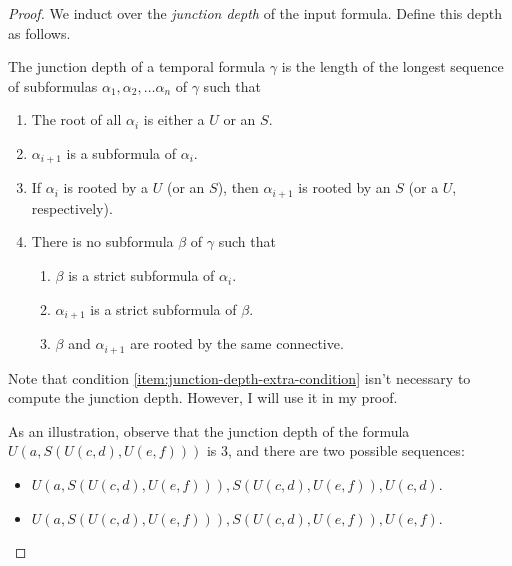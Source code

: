 \documentclass[a4paper,UKenglish,cleveref, autoref, thm-restate, numberwithinsect]{lipics-v2021}
\begin{document}
\begin{proof}
    We induct over the \textit{junction depth} of the input formula. Define this depth as follows.
    \begin{definition}
        The junction depth of a temporal formula $\gamma$ is the length of the longest sequence of subformulas $\alpha_1, \alpha_2, \ldots \alpha_n$ of $\gamma$ such that
        \begin{enumerate}
            \item The root of all $\alpha_i$ is either a $U$ or an $S$.
            \item $\alpha_{i+1}$ is a subformula of $\alpha_i$.
            \item If $\alpha_i$ is rooted by a $U$ (or an $S$), then $\alpha_{i+1}$ is rooted by an $S$ (or a $U$, respectively).
            \item There is no subformula $\beta$ of $\gamma$ such that \label{item:junction-depth-extra-condition}
                \begin{enumerate}
                    \item $\beta$ is a strict subformula of $\alpha_i$.
                    \item $\alpha_{i+1}$ is a strict subformula of $\beta$.
                    \item $\beta$ and $\alpha_{i+1}$ are rooted by the same connective.
                \end{enumerate}
        \end{enumerate}
    \end{definition}
    Note that condition \ref{item:junction-depth-extra-condition} isn't necessary to compute the junction depth. However, I will use it in my proof.

    As an illustration, observe that the junction depth of the formula $U \left(a, S\left( U(c, d), U(e, f) \right) \right)$ is 3, and there are two possible sequences:
    \begin{itemize}
        \item $U \left(a, S\left( U(c, d), U(e, f) \right) \right), S(U(c, d), U(e, f)), U(c, d)$.
        \item $U \left(a, S\left( U(c, d), U(e, f) \right) \right), S(U(c, d), U(e, f)), U(e, f)$.
    \end{itemize}


\end{proof}
\end{document}
